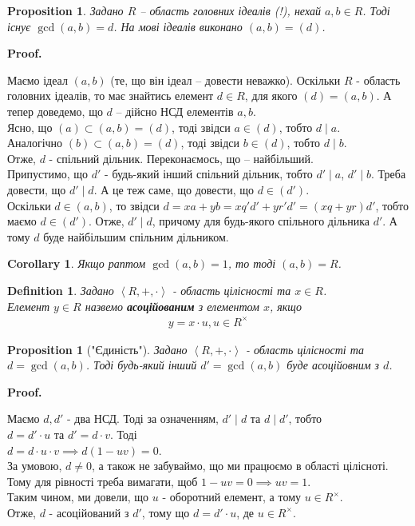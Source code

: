 \documentclass[a4paper, 10pt]{article}
\makeatletter
\theoremstyle{theoremdd}
\theoremstyle{theoremdd}
\newtheorem{definition}[theorem]{Definition}
\theoremstyle{theoremdd}
\theoremstyle{theoremdd}
\theoremstyle{theoremdd}
\theoremstyle{theoremdd}
\theoremstyle{theoremdd}
\theoremstyle{theoremdd}
\theoremstyle{theoremdd}
\newtheorem{proposition}[theorem]{Proposition}
\theoremstyle{theoremdd}
\theoremstyle{theoremdd}
\theoremstyle{theoremdd}
\theoremstyle{theoremdd}
\theoremstyle{theoremdd}
\newtheorem{corollary}[theorem]{Corollary}
\theoremstyle{theoremdd}
\renewenvironment{proof}[1][Proof.\\]{\par
\pushQED{\hfill \qed}%
\normalfont \topsep6\p@\@plus6\p@\relax
\trivlist
\item\relax
{\bfseries
#1\@addpunct{.}}\hspace\labelsep\ignorespaces
}{%
\popQED\endtrivlist\@endpefalse
}
\makeatother
\begin{document}
\begin{proposition}
Задано $R$ -- область головних ідеалів (!), нехай $a,b \in R$. Тоді існує $\gcd(a,b) = d$. На мові ідеалів виконано $(a,b) = (d)$.
\end{proposition}

\begin{proof}
Маємо ідеал $(a,b)$ (те, що він ідеал -- довести неважко). Оскільки $R$ - область головних ідеалів, то має знайтись елемент $d \in R$, для якого $(d) = (a,b)$. А тепер доведемо, що $d$ -- дійсно НСД елементів $a,b$.\\
Ясно, що $(a) \subset (a,b) = (d)$, тоді звідси $a \in (d)$, тобто $d \mid a$.\\
Аналогічно $(b) \subset (a,b) = (d)$, тоді звідси $b \in (d)$, тобто $d \mid b$.\\
Отже, $d$ - спільний дільник. Переконаємось, що -- найбільший.\\
Припустимо, що $d'$ - будь-який інший спільний дільник, тобто $d' \mid a$, $d' \mid b$. Треба довести, що $d' \mid d$. А це теж саме, що довести, що $d \in (d')$.\\
Оскільки $d \in (a,b)$, то звідси $d = xa + yb = xq'd' + yr'd' = (xq+yr)d'$, тобто маємо $d \in (d')$. Отже, $d' \mid d$, причому для будь-якого спільного дільника $d'$. А тому $d$ буде найбільшим спільним дільником.
\end{proof}

\begin{corollary}
Якщо раптом $\gcd(a,b) = 1$, то тоді $(a,b) = R$.
\end{corollary}

\begin{definition}
Задано $\left<R,+,\cdot \right>$ - область цілісності та $x \in R$.\\
Елемент $y \in R$ назвемо \textbf{асоційованим} з елементом $x$, якщо
\begin{align*}
y = x \cdot u, u \in R^\times
\end{align*}
\end{definition}



\begin{proposition}["Єдиність"]
Задано $\left<R,+,\cdot\right>$ - область цілісності та $d = \gcd(a,b)$. Тоді будь-який інший $d' = \gcd(a,b)$ буде асоційовним з $d$.
\end{proposition}

\begin{proof}
Маємо $d,d'$ - два НСД. Тоді за означенням, $d' \mid  d$ та $d \mid d'$, тобто\\
$d = d' \cdot u$ та $d' = d \cdot v$. Тоді\\
$d = d \cdot u \cdot v \implies d(1-uv) = 0$.\\
За умовою, $d \neq 0$, а також не забуваймо, що ми працюємо в області цілісноті. Тому для рівності треба вимагати, щоб $1 - uv = 0 \implies uv = 1$.\\
Таким чином, ми довели, що $u$ - оборотний елемент, а тому $u \in R^\times$.\\
Отже, $d$ - асоційований з $d'$, тому що $d = d' \cdot u$, де $u \in R^\times$.
\end{proof}
\end{document}

